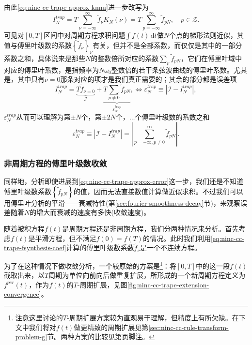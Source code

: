 由此\eqref{eq:ninc-cc-trape-approx-knnu}进一步改写为
\begin{equation*}
  I_{N}^{trap} = T \sum_{\nu = -\infty}^{\infty}
  \tilde{f}_{\nu} K_{N} \left( \nu \right) = T \sum_{p = - \infty}^{\infty} \tilde{f}_{p N}, \quad p \in \mathcal{Z}.
\end{equation*}
可见对$[0,T]$区间中对周期方程求积问题$\int f(t) \, \mathrm{d} t$做$N$个点的梯形法则近似，其值与傅里叶级数的系数$\left\{ \tilde{f}_{\nu} \right\}_{\nu}$有关，但并不是全部系数，而仅仅是其中的一部分系数之和，具体说来是那些$N$的整数倍所对应的系数$\sum_{p} \tilde{f}_{p N}$，它们在傅里叶域中对应的傅里叶系数，是指频率为$N \omega_{0}$整数倍的若干条弦波曲线的傅里叶系数。尤其是，其中只有$\nu = 0$那条对应的项才是我们真正需要的；其余的部分都是误差项
\begin{equation*}
  I_{N}^{trap} =
  \underbrace{
  T \tilde{f}_{\nu = 0}
  }_{\mathcal{I}}
   +
   \underbrace{
   T \sum_{ p \neq 0} \tilde{f}_{p N}
   }_{\varepsilon_{N}^{trap}}, \Leftrightarrow \varepsilon_{N}^{trap} \equiv \left| \mathcal{I} - I_{N}^{trap} \right|,
\end{equation*}
$\varepsilon_{N}^{trap}$从而可以理解为第$\pm N$个，第$\pm 2N$个，$\ldots$个傅里叶级数的系数之和
\begin{equation}
  \label{eq:ninc-cc-trape-approx-error}
  \varepsilon_{N}^{trap} \equiv \left| \mathcal{I} - I_{N}^{trap} \right| = \left| \sum_{p = - \infty, p \neq 0}^{\infty} \tilde{f}_{p N} \right|.
\end{equation}

\subsubsection{非周期方程的傅里叶级数收敛}
\label{sec:ninc-cc-trapezoidao-convergence}

同样地，分析即使进展到\eqref{eq:ninc-cc-trape-approx-error}这一步，我们还是不知道傅里叶级数系数$\left\{ \tilde{f}_{p N}\right\}$的值，因而无法直接数值计算做近似求积。不过我们可以用傅里叶分析的平滑——衰减特性(第\ref{sec:fourier-smoothness-decay}节)，来观察误差随着$N$的增大而衰减的速度有多快(收敛速度)。

随着被积方程$f(t)$是周期方程还是非周期方程，我们分两种情况来分析。首先考虑$f(t)$是平滑方程，但不满足$f(0)=f(T)$的情况。此时我们利用\eqref{eq:ninc-cc-trape-fsynthesis-coef}计算的傅里叶级数系数$\tilde{f}_{\nu}$是一个不连续方程。

为了在这种情况下做收敛分析，一个较原始的方案是\footnote{注意这里讨论的$T$-周期扩展方案较为直观易于理解，但精度上有所欠缺。在下文中我们将对$f(t)$做更精致的周期扩展见第\ref{sec:ninc-cc-rule-transform-problem-g}节。两种方案的比较见第\pageref{footnote:fanganbijiao}页脚注。}：将$[0,T]$中的这一段$f(t)$截取出来，以$T$周期为单位向前向后做重复扩展，所形成的一个新周期方程定义为$f^{per}(t)$，作为$f(t)$的$T$-周期扩展，见图\ref{fig:ninc-cc-trape-extension-convergence}。

